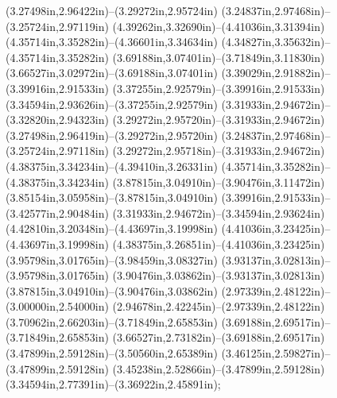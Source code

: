 (3.27498in,2.96422in)--(3.29272in,2.95724in) (3.24837in,2.97468in)--(3.25724in,2.97119in) (4.39262in,3.32690in)--(4.41036in,3.31394in) (4.35714in,3.35282in)--(4.36601in,3.34634in) (4.34827in,3.35632in)--(4.35714in,3.35282in) (3.69188in,3.07401in)--(3.71849in,3.11830in) (3.66527in,3.02972in)--(3.69188in,3.07401in) (3.39029in,2.91882in)--(3.39916in,2.91533in) (3.37255in,2.92579in)--(3.39916in,2.91533in) (3.34594in,2.93626in)--(3.37255in,2.92579in) (3.31933in,2.94672in)--(3.32820in,2.94323in) (3.29272in,2.95720in)--(3.31933in,2.94672in) (3.27498in,2.96419in)--(3.29272in,2.95720in) (3.24837in,2.97468in)--(3.25724in,2.97118in) (3.29272in,2.95718in)--(3.31933in,2.94672in) (4.38375in,3.34234in)--(4.39410in,3.26331in) (4.35714in,3.35282in)--(4.38375in,3.34234in) (3.87815in,3.04910in)--(3.90476in,3.11472in) (3.85154in,3.05958in)--(3.87815in,3.04910in) (3.39916in,2.91533in)--(3.42577in,2.90484in) (3.31933in,2.94672in)--(3.34594in,2.93624in) (4.42810in,3.20348in)--(4.43697in,3.19998in) (4.41036in,3.23425in)--(4.43697in,3.19998in) (4.38375in,3.26851in)--(4.41036in,3.23425in) (3.95798in,3.01765in)--(3.98459in,3.08327in) (3.93137in,3.02813in)--(3.95798in,3.01765in) (3.90476in,3.03862in)--(3.93137in,3.02813in) (3.87815in,3.04910in)--(3.90476in,3.03862in) (2.97339in,2.48122in)--(3.00000in,2.54000in) (2.94678in,2.42245in)--(2.97339in,2.48122in) (3.70962in,2.66203in)--(3.71849in,2.65853in) (3.69188in,2.69517in)--(3.71849in,2.65853in) (3.66527in,2.73182in)--(3.69188in,2.69517in) (3.47899in,2.59128in)--(3.50560in,2.65389in) (3.46125in,2.59827in)--(3.47899in,2.59128in) (3.45238in,2.52866in)--(3.47899in,2.59128in) (3.34594in,2.77391in)--(3.36922in,2.45891in);
